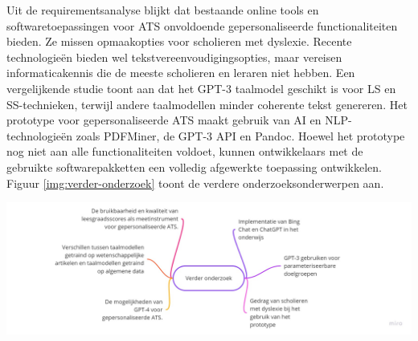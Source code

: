 \documentclass[a0,portrait]{hogent-poster}
\begin{document}
\begin{multicols}{2}
Uit de requirementsanalyse blijkt dat bestaande online tools en softwaretoepassingen voor ATS onvoldoende gepersonaliseerde functionaliteiten bieden. Ze missen opmaakopties voor scholieren met dyslexie. Recente technologieën bieden wel tekstvereenvoudigingsopties, maar vereisen informaticakennis die de meeste scholieren en leraren niet hebben. Een vergelijkende studie toont aan dat het GPT-3 taalmodel geschikt is voor LS en SS-technieken, terwijl andere taalmodellen minder coherente tekst genereren. Het prototype voor gepersonaliseerde ATS maakt gebruik van AI en NLP-technologieën zoals PDFMiner, de GPT-3 API en Pandoc. Hoewel het prototype nog niet aan alle functionaliteiten voldoet, kunnen ontwikkelaars met de gebruikte softwarepakketten een volledig afgewerkte toepassing ontwikkelen. Figuur \ref{img:verder-onderzoek} toont de verdere onderzoeksonderwerpen aan.

\begin{center}
	\captionsetup{type=figure}
	\includegraphics[width=1.0\linewidth]{figures/verder-onderzoek.jpg}
	\label{img:verder-onderzoek}
\end{center}

\end{multicols}
\end{document}
